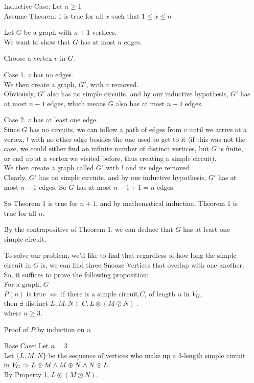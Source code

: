 \documentclass[fleqn]{article}
\begin{document}
Inductive Case: Let $n \geq 1$\\
Assume Theorem 1 is true for all $x$ such that $1 \leq x \leq n$

Let $G$ be a graph with $n+1$ vertices.\\
We want to show that $G$ has at most $n$ edges.

Choose a vertex $v$ in $G$.

Case 1. $v$ has no edges.\\
We then create a graph, $G'$, with $v$ removed.\\
Obviously, $G'$ also has no simple circuits, and by our inductive hypothesis, $G'$ has at most $n-1$ edges, which means $G$ also has at most $n-1$ edges.

Case 2. $v$ has at least one edge.\\
Since $G$ has no circuits, we can follow a path of edges from $v$ until we arrive at a vertex, $l$ with no other edge besides the one used to get to it (if this was not the case, we could either find an infinite number of distinct vertices, but $G$ is finite, or end up at a vertex we visited before, thus creating a simple circuit).\\
We then create a graph called $G'$ with $l$ and its edge removed.
\\Clearly, $G'$ has no simple circuits, and by our inductive hypothesis, $G'$ has at most $n-1$ edges. So $G$ has at most $n-1+1=n$ edges.


So Theorem 1 is true for $n+1$, and by mathematical induction, Theorem 1 is true for all $n$.
 
By the contrapositive of Theorem 1, we can deduce that $G$ has at least one simple circuit.

To solve our problem, we'd like to find that regardless of how long the simple circuit in $G$ is, we can find three Snooze Vertices that overlap with one another.\\
So, it suffices to prove the following proposition:\\
For a graph, $G$\\
$P(n)$ is true $\Leftrightarrow$ if there is a simple circuit,$C$, of length $n$ in $V_G$,\\ then $\exists$ distinct $ L,M,N \in C,
                       L \circledast (M \oslash N)$ .\\
where $n \geq 3$.

Proof of $P$ by induction on $n$

Base Case: Let $n = 3$\\
Let $\lbrace L, M, N \rbrace$ be the sequence of vertices who make up a 3-length simple circuit in $V_G \Rightarrow\\
L \circledast M \wedge M \circledast N \wedge N \circledast L$.\\
By Property 1, $L \circledast (M \oslash N)$.
\end{document}
